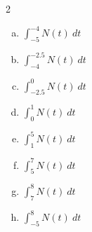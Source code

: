 \begin{multicols*}{2}
{\everymath{\displaystyle}
\begin{enumerate}[(a)]
    \item $\int_{-5}^{-4} N(t)\ dt$

    \vfill
    \item $\int_{-4}^{-2.5} N(t)\ dt$

    \vfill
    \item $\int_{-2.5}^0 N(t)\ dt$

    \vfill
    \item $\int_0^1 N(t)\ dt$

    \vfill
    \columnbreak
    \item $\int_1^5 N(t)\ dt$

    \vfill
    \item $\int_{5}^7 N(t)\ dt$

    \vfill
    \item $\int_{7}^8 N(t)\ dt$

    \vfill
    \item $\int_{-5}^8 N(t)\ dt$
    

\end{enumerate}
}
\end{multicols*}
\pagebreak
